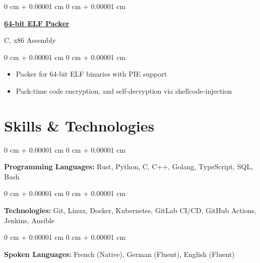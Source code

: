 \documentclass[10pt, letterpaper]{article}
\newenvironment{highlights}{
    \begin{itemize}[
        topsep=0.10 cm,
        parsep=0.10 cm,
        partopsep=0pt,
        itemsep=0pt,
        leftmargin=0 cm + 10pt
    ]
}{
    \end{itemize}
}
\newenvironment{onecolentry}{
    \begin{adjustwidth}{
        0 cm + 0.00001 cm
    }{
        0 cm + 0.00001 cm
    }
}{
    \end{adjustwidth}
}
\newenvironment{twocolentry}[2][]{
    \onecolentry
    \def\secondColumn{#2}
    \setcolumnwidth{\fill, 4.5 cm}
    \begin{paracol}{2}
}{
    \switchcolumn \raggedleft \secondColumn
    \end{paracol}
    \endonecolentry
}
\begin{document}
    \vspace{0.2cm}

    \begin{twocolentry}
        {C, x86 Assembly}
        \href{https://github.com/winstonallo/woody-woodpacker}{\textbf{64-bit ELF Packer}}
    \end{twocolentry}

    \vspace{0.10 cm}

    \begin{onecolentry}
        \begin{highlights}
            \item Packer for 64-bit ELF binaries with PIE support
            \item Pack-time code encryption, and self-decryption via shellcode-injection
        \end{highlights}
    \end{onecolentry}

    \section{Skills \& Technologies}

    \begin{onecolentry}
        \textbf{Programming Languages:} Rust, Python, C, C++, Golang, TypeScript, SQL, Bash
    \end{onecolentry}

    \vspace{0.2 cm}

    \begin{onecolentry}
        \textbf{Technologies:} Git, Linux, Docker, Kubernetes, GitLab CI/CD, GitHub Actions, Jenkins, Ansible
    \end{onecolentry}

    \vspace{0.2 cm}

    \begin{onecolentry}
        \textbf{Spoken Languages:} French (Native), German (Fluent), English (Fluent)
    \end{onecolentry}
\end{document}
